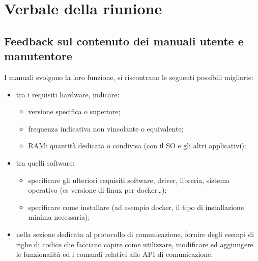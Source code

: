 \section{Verbale della riunione}

\subsection{Feedback sul contenuto dei manuali utente e manutentore}
\label{manuali}
    I manuali svolgono la loro funzione, si riscontrano le seguenti possibili migliorie:
    \begin{itemize}
        \item tra i requisiti hardware, indicare:
        \begin{itemize}
            \item versione specifica o superiore;
            \item frequenza indicativa non vincolante o equivalente;
            \item RAM: quantità dedicata o condivisa (con il SO e gli altri applicativi);
        \end{itemize}
        \item tra quelli software:
        \begin{itemize}
            \item specificare gli ulteriori requisiti software, driver, libreria, sistema operativo (es versione di linux per docker…);

            \item specificare come installare (ad esempio docker, il tipo di installazione minima necessaria);

        \end{itemize}
        \item nella sezione dedicata al protocollo di comunicazione, fornire degli esempi di righe di codice che facciano capire come utilizzare, modificare ed aggiungere le funzionalità ed i comandi relativi alle API di comunicazione.
    \end{itemize}

